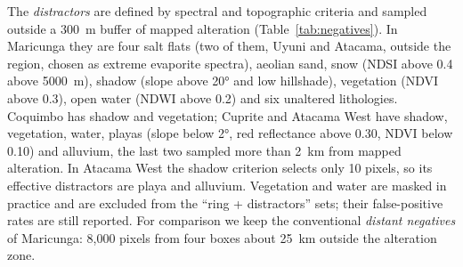 \documentclass[preprint,authoryear,number]{elsarticle}
\begin{document}
The \emph{distractors} are defined by spectral and topographic criteria and sampled outside a \SI{300}{\meter} buffer of mapped alteration (Table~\ref{tab:negatives}). In Maricunga they are four salt flats (two of them, Uyuni and Atacama, outside the region, chosen as extreme evaporite spectra), aeolian sand, snow (NDSI above 0.4 above \SI{5000}{\meter}), shadow (slope above \ang{20} and low hillshade), vegetation (NDVI above 0.3), open water (NDWI above 0.2) and six unaltered lithologies. Coquimbo has shadow and vegetation; Cuprite and Atacama West have shadow, vegetation, water, playas (slope below \ang{2}, red reflectance above 0.30, NDVI below 0.10) and alluvium, the last two sampled more than \SI{2}{\kilo\meter} from mapped alteration. In Atacama West the shadow criterion selects only 10 pixels, so its effective distractors are playa and alluvium. Vegetation and water are masked in practice and are excluded from the ``ring + distractors'' sets; their false-positive rates are still reported. For comparison we keep the conventional \emph{distant negatives} of Maricunga: 8{,}000 pixels from four boxes about \SI{25}{\kilo\meter} outside the alteration zone.

\begin{table}[ht]
\centering
\caption{Negative groups and number of pixels per site.}
\label{tab:negatives}
\small
{}
\end{table}
\end{document}
